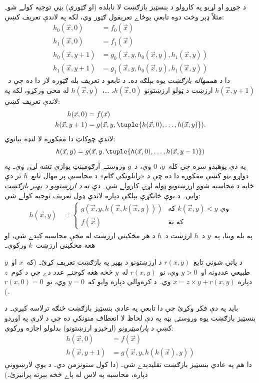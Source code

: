 \documentclass[../../../include/open-logic-section]{subfiles}
\begin{document}

د جوړو او لړيو په کارولو د بنسټيز بازګښت لا نابلده (او ګټورې) بڼې توجيه کولے شو۔ مثلاً ډېر وخت دوه تابعې يوځاے تعريفول ګټور وي، لکه په لاندې تعريف کښې:
\begin{align*}
h_0(\vec x, 0) & = f_0(\vec x) \\
h_1(\vec x, 0) & = f_1(\vec x) \\
h_0(\vec x, y+1) & = g_0(\vec x, y, h_0(\vec x, y), h_1(\vec x, y)) \\
h_1(\vec x, y+1) & = g_1(\vec x, y, h_0(\vec x, y), h_1(\vec x, y))
\end{align*}
دا د \emph{هممهاله بازګښت} يوه بېلګه ده۔ د تابعو د تعريف بله ګټوره لار دا ده چې د~$h(\vec x, y+1)$ ارزښت د ټولو ارزښتونو $h(\vec x, 0)$، \dots،~$h(\vec x, y)$ له مخې ورکړو، لکه په لاندې تعريف کښې:
\begin{align*}
h(\vec x, 0) & = f(\vec x) \\
h(\vec x, y+1) & = g(\vec x, y, \tuple{h(\vec x, 0), \dots, h(\vec x, y)}).
\end{align*}
لاندې چوکاټ دا مفکوره لا لنډه بيانوي:
\[
h(\vec x, y) = g(\vec x, y, \tuple{h(\vec x, 0), \dots, h(\vec x, y-1)})
\]
په دې پوهېدو سره چې کله~$y$، $0$ وي، د~$g$ وروستے آرګومېنټ يوازې تشه لړۍ وي۔ په دواړو بڼو کښې مفکوره دا ده چې د «راتلونکي ګام» د محاسبې پر مهال تابع~$h$ تر دې ځايه د محاسبه شوو ارزښتونو ټوله لړۍ کارولے شي۔ دې ته \emph{د ارزښتونو د بهير بازګښت} وايي۔ د يوې ځانګړې بېلګې دپاره لاندې ډول تعريف توجيه کولے شي:
\begin{align*}
h(\vec x, y) & = \begin{cases}
  g(\vec x, y, h(\vec x, k(\vec x, y))) & \text{که $k(\vec x, y) < y$ وي} \\
  f(\vec x) & \text{که نۀ}
\end{cases}
\end{align*}
په بله وينا، په~$y$ د~$h$ ارزښت د~$h$ د هر مخکيني ارزښت له مخې محاسبه کېدے شي، او هغه مخکينی ارزښت~$k$ ورکوي۔

\begin{prob}
  د پاتې شوني تابع~$r(x,y)$ د ارزښتونو د بهير په بازګښت تعريف کړئ۔ (که~$x$ او~$y$ طبيعي عددونه او~$y > 0$ وي، نو~$r(x,y)$ له~$y$ څخه هغه کوچنے عدد دے چې د کوم~$z$ دپاره $x = z\times y + r(x,y)$ وي۔ د کره‌والي دپاره وايو که~$y=0$ وي، نو~$r(x,0) = 0$۔)
\end{prob}

بايد په دې فکر وکړئ چې دا تابعې په عادي بنسټيز بازګښت څنګه ترلاسه کېږي۔ د بنسټيز بازګښت يوه وروستۍ بڼه په دې لحاظ لا انعطاف منونکې ده چې د لارې په اوږدو کښې د \emph{پاراميټرونو} (اړخيزو ارزښتونو) بدلولو اجازه ورکوي:
\begin{align*}
h(\vec x, 0) & = f(\vec x) \\
h(\vec x, y+1) & = g(\vec x, y, h(k(\vec x), y))
\end{align*}
دا هم په عادي بنسټيز بازګښت تقليدېدے شي۔ (دا کول ستونزمن دي۔ د يوې لارښوونې دپاره، محاسبه په لاس له پاے څخه بېرته پرانيزئ۔)
\end{document}

